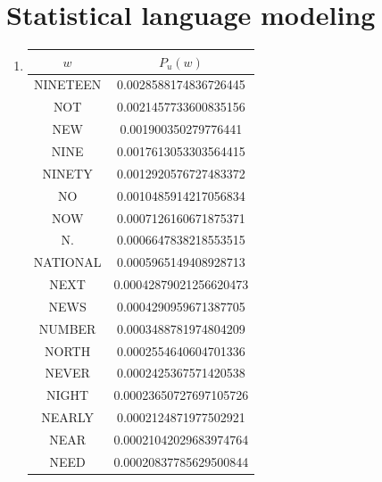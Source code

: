 \documentclass[11]{article}
\begin{document}
\section{Statistical language modeling}
\begin{enumerate}[label=(\alph*)]
\item
\begin{center}
\begin{tabular}{|c|c|}
\hline
\textbf{$w$} & \textbf{$P_u(w)$}      \\ \hline
NINETEEN     & 0.0028588174836726445  \\ \hline
NOT          & 0.0021457733600835156  \\ \hline
NEW          & 0.001900350279776441   \\ \hline
NINE         & 0.0017613053303564415  \\ \hline
NINETY       & 0.0012920576727483372  \\ \hline
NO           & 0.0010485914217056834  \\ \hline
NOW          & 0.0007126160671875371  \\ \hline
N.           & 0.0006647838218553515  \\ \hline
NATIONAL     & 0.0005965149408928713  \\ \hline
NEXT         & 0.00042879021256620473 \\ \hline
NEWS         & 0.0004290959671387705  \\ \hline
NUMBER       & 0.0003488781974804209  \\ \hline
NORTH        & 0.0002554640604701336  \\ \hline
NEVER        & 0.0002425367571420538  \\ \hline
NIGHT        & 0.00023650727697105726 \\ \hline
NEARLY       & 0.0002124871977502921  \\ \hline
NEAR         & 0.00021042029683974764 \\ \hline
NEED         & 0.00020837785629500844 \\ \hline
\end{tabular}
\end{center}


\end{enumerate}
\end{document}
